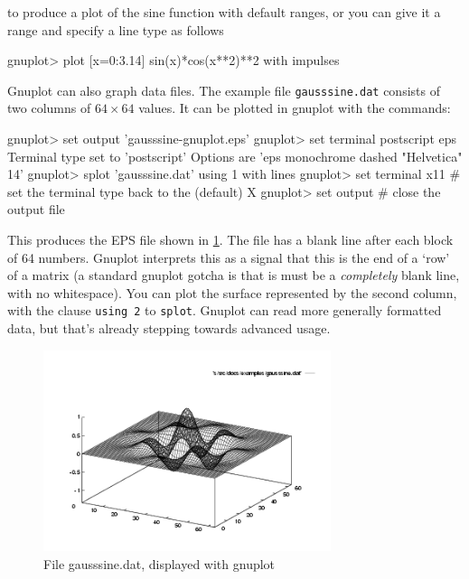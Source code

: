 \documentclass[11pt,oneside,chapters]{starlink}
\begin{document}
to produce a plot of the sine function with default
ranges, or you can give it a range and specify a line type
as follows

\begin{terminalv}
gnuplot> plot [x=0:3.14] sin(x)*cos(x**2)**2 with impulses
\end{terminalv}

Gnuplot can also graph data files.  The example file
\texttt{gausssine.dat} consists of two columns of
$64 \times 64$ values.  It can be
plotted in gnuplot with the commands:

\begin{terminalv}
gnuplot> set output 'gausssine-gnuplot.eps'
gnuplot> set terminal postscript eps
Terminal type set to 'postscript'
Options are 'eps monochrome dashed "Helvetica" 14'
gnuplot> splot 'gausssine.dat' using 1 with lines
gnuplot> set terminal x11    # set the terminal type back to the (default) X
gnuplot> set output          # close the output file
\end{terminalv}

This produces the EPS file shown in \ref{f:gausssine:g}.
The file has a blank line after
each block of 64 numbers.  Gnuplot interprets this as a
signal that this is the end of a `row' of a matrix (a
standard gnuplot gotcha is that is must be a
\emph{completely} blank line, with no whitespace).  You
can plot the surface represented by the second column,
with the clause \texttt{using 2} to
\texttt{splot}.  Gnuplot can read more generally
formatted data, but that's already stepping towards
advanced usage.

\begin{figure}
\center
\includegraphics[width=0.75\textwidth]{sc13-gausssine-gnuplot}
\caption{File gausssine.dat, displayed with
gnuplot
}
\label{f:gausssine:g}
\end{figure}
\end{document}
